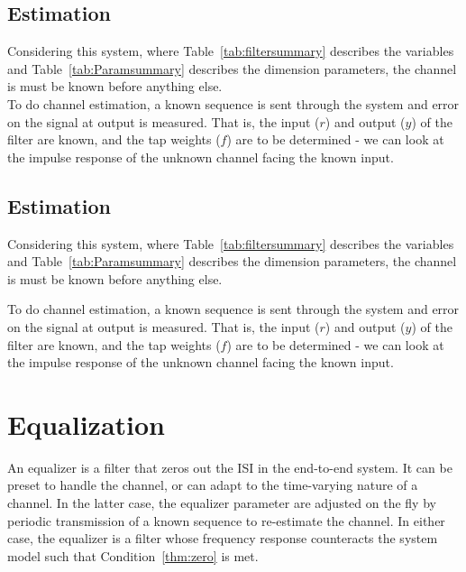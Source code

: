 \documentclass[]{article}
\begin{document}
\subsection{Estimation}
\label{sec:estimate}

Considering this system, where Table~\ref{tab:filtersummary} describes the variables and Table~\ref{tab:Paramsummary} describes the dimension parameters, the channel is must be known before anything else. \\

To do channel estimation, a known sequence is sent through the system and error on the signal at output is measured.  That is, the input ($r$) and output ($y$) of the filter are known, and the tap weights ($f$) are to be determined - we can look at the impulse response of the unknown channel facing the known input.  

\subsection{Estimation}
\label{sec:estimate}

Considering this system, where Table~\ref{tab:filtersummary} describes the variables and Table~\ref{tab:Paramsummary} describes the dimension parameters, the channel is must be known before anything else.

To do channel estimation, a known sequence is sent through the system and error on the signal at output is measured.  That is, the input ($r$) and output ($y$) of the filter are known, and the tap weights ($f$) are to be determined - we can look at the impulse response of the unknown channel facing the known input.  

\section{Equalization}
\label{sec:equal}
An equalizer is a filter that zeros out the ISI in the end-to-end system.  It can be preset to handle the channel, or can adapt to the time-varying nature of a channel.  In the latter case, the equalizer parameter are adjusted on the fly by periodic transmission of a known sequence to re-estimate the channel.  In either case, the equalizer is a filter whose frequency response counteracts the system model such that Condition~\ref{thm:zero} is met. 
\end{document}
